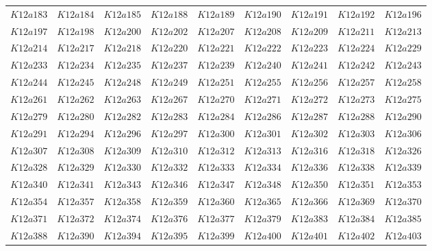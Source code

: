 \documentclass{amsart} %
\theoremstyle{thm}
\theoremstyle{definition}
\numberwithin{equation}{section}
\begin{document}
{\begin{longtable}{@{}lllllllll@{}}
  $K12a183$ &  
  $K12a184$ &  
  $K12a185$ &  
  $K12a188$ &  
  $K12a189$ &  
  $K12a190$ &  
  $K12a191$ &  
  $K12a192$ &  
  $K12a196$ \\   
  $K12a197$ &  
  $K12a198$ &  
  $K12a200$ &  
  $K12a202$ &  
  $K12a207$ &  
  $K12a208$ &  
  $K12a209$ &  
  $K12a211$ &  
  $K12a213$ \\   
  $K12a214$ &  
  $K12a217$ &  
  $K12a218$ &  
  $K12a220$ &  
  $K12a221$ &  
  $K12a222$ &  
  $K12a223$ &  
  $K12a224$ &  
  $K12a229$ \\   
  $K12a233$ &  
  $K12a234$ &  
  $K12a235$ &  
  $K12a237$ &  
  $K12a239$ &  
  $K12a240$ &  
  $K12a241$ &  
  $K12a242$ &  
  $K12a243$ \\   
  $K12a244$ &  
  $K12a245$ &  
  $K12a248$ &  
  $K12a249$ &  
  $K12a251$ &  
  $K12a255$ &  
  $K12a256$ &  
  $K12a257$ &  
  $K12a258$ \\   
  $K12a261$ &  
  $K12a262$ &  
  $K12a263$ &  
  $K12a267$ &  
  $K12a270$ &  
  $K12a271$ &  
  $K12a272$ &  
  $K12a273$ &  
  $K12a275$ \\   
  $K12a279$ &  
  $K12a280$ &  
  $K12a282$ &  
  $K12a283$ &  
  $K12a284$ &  
  $K12a286$ &  
  $K12a287$ &  
  $K12a288$ &  
  $K12a290$ \\   
  $K12a291$ &  
  $K12a294$ &  
  $K12a296$ &  
  $K12a297$ &  
  $K12a300$ &  
  $K12a301$ &  
  $K12a302$ &  
  $K12a303$ &  
  $K12a306$ \\  
  $K12a307$ &  
  $K12a308$ &  
  $K12a309$ &  
  $K12a310$ &  
  $K12a312$ &  
  $K12a313$ &  
  $K12a316$ &  
  $K12a318$ &  
  $K12a326$ \\   
  $K12a328$ &  
  $K12a329$ &  
  $K12a330$ &  
  $K12a332$ &  
  $K12a333$ &  
  $K12a334$ &  
  $K12a336$ &  
  $K12a338$ &  
  $K12a339$ \\ 
  $K12a340$ &  
  $K12a341$ &  
  $K12a343$ &  
  $K12a346$ &  
  $K12a347$ &  
  $K12a348$ &  
  $K12a350$ &  
  $K12a351$ &  
  $K12a353$ \\   
  $K12a354$ &  
  $K12a357$ &  
  $K12a358$ &  
  $K12a359$ &  
  $K12a360$ &  
  $K12a365$ &  
  $K12a366$ &  
  $K12a369$ &  
  $K12a370$ \\   
  $K12a371$ &  
  $K12a372$ &  
  $K12a374$ &  
  $K12a376$ &  
  $K12a377$ &  
  $K12a379$ &  
  $K12a383$ &  
  $K12a384$ &  
  $K12a385$ \\   
  $K12a388$ &  
  $K12a390$ &  
  $K12a394$ &  
  $K12a395$ &  
  $K12a399$ &  
  $K12a400$ &  
  $K12a401$ &  
  $K12a402$ &  
  $K12a403$ \\   

\end{longtable}}
\end{document}
